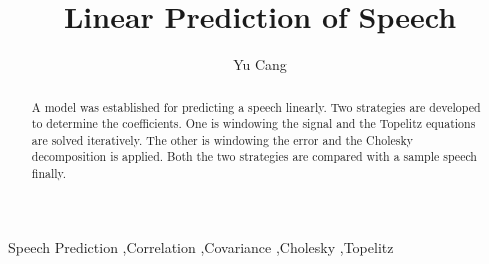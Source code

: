 \documentclass[preprint,12pt]{elsarticle}
\begin{document}
\begin{frontmatter}



\title{Linear Prediction of Speech}


\author{Yu Cang}
\address{Shanghai Jiao Tong University, China}

\begin{abstract}
A model was established for predicting a speech linearly. Two strategies are developed to determine the coefficients. One is windowing the signal and the Topelitz equations are solved iteratively. The other is windowing the error and the Cholesky decomposition is applied. Both the two strategies are compared with a sample speech finally.
\end{abstract}

\begin{keyword}
Speech Prediction \sep Correlation \sep Covariance \sep Cholesky \sep Topelitz


\end{keyword}

\end{frontmatter}


\end{document}
